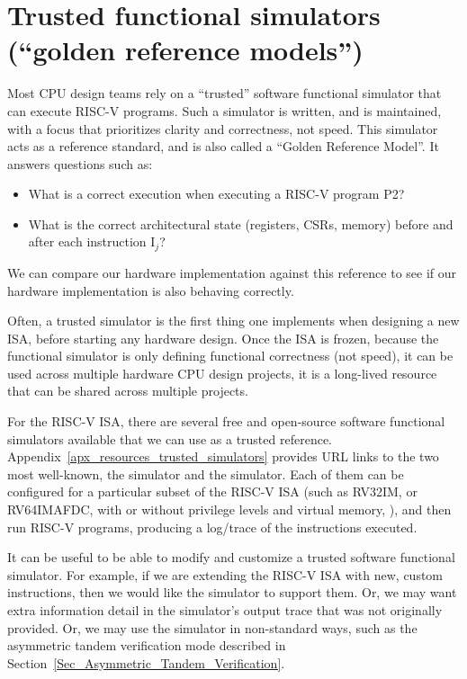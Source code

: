 \section{Trusted functional simulators (``golden reference models'')}


Most CPU design teams rely on a ``trusted'' software functional
simulator that can execute RISC-V programs.  Such a simulator is
written, and is maintained, with a focus that prioritizes clarity and
correctness, not speed.  This simulator acts as a reference standard,
and is also called a ``Golden Reference Model''.  It answers questions
such as:

\begin{itemize}
 \item What is a correct execution when executing a RISC-V program P2?

 \item What is the correct architectural state (registers, CSRs, memory) before
     and after each instruction I$_j$?

\end{itemize}

We can compare our hardware implementation against this reference to
see if our hardware implementation is also behaving correctly.

Often, a trusted simulator is the first thing one implements when
designing a new ISA, before starting any hardware design.  Once the
ISA is frozen, because the functional simulator is only defining
functional correctness (not speed), it can be used across multiple
hardware CPU design projects, {\ie} it is a long-lived resource that
can be shared across multiple projects.

For the RISC-V ISA, there are several free and open-source software
functional simulators available that we can use as a trusted
reference.  Appendix~\ref{apx_resources_trusted_simulators} provides
URL links to the two most well-known, the {\SPIKE} simulator and the
{\SAIL} simulator.  Each of them can be configured for a particular
subset of the RISC-V ISA (such as RV32IM, or RV64IMAFDC, with or
without privilege levels and virtual memory, {\etc}), and then run
RISC-V programs, producing a log/trace of the instructions executed.

It can be useful to be able to modify and customize a trusted software
functional simulator.  For example, if we are extending the RISC-V ISA
with new, custom instructions, then we would like the simulator to
support them.  Or, we may want extra information detail in the
simulator's output trace that was not originally provided.
Or, we may use the simulator in non-standard ways, such
as the asymmetric tandem verification mode described in
Section~\ref{Sec_Asymmetric_Tandem_Verification}.

